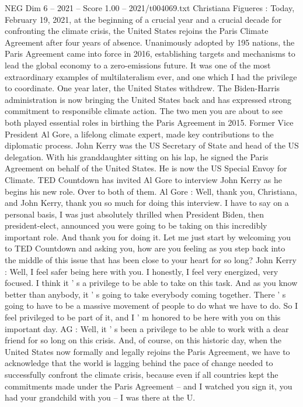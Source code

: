 \begin{textsample}{NEG Dim 6 – 2021 – Score 1.00 – 2021/t004069.txt}  \label{ex:f6_neg_002}
Christiana Figueres : Today, February 19, 2021, at the beginning of a crucial year and a crucial decade for confronting the climate crisis, the United States rejoins the Paris Climate Agreement after four years of absence.
Unanimously adopted by 195 nations, the Paris Agreement came into force in 2016, establishing targets and mechanisms to lead the global economy to a zero-emissions future.
It was one of the most extraordinary examples of multilateralism ever, and one which I had the privilege to coordinate.
One year later, the United States withdrew.
The Biden-Harris administration is now bringing the United States back and has expressed strong commitment to responsible climate action.
The two men you are about to see both played essential roles in birthing the Paris Agreement in 2015.
Former Vice President Al Gore, a lifelong climate expert, made key contributions to the diplomatic process.
John Kerry was the US Secretary of State and head of the US delegation.
With his granddaughter sitting on his lap, he signed the Paris Agreement on behalf of the United States.
He is now the US Special Envoy for Climate.
TED Countdown has invited Al Gore to interview John Kerry as he begins his new role.
Over to both of them.
Al Gore : Well, thank you, Christiana, and John Kerry, thank you so much for doing this interview.
I have to say on a personal basis, I was just absolutely thrilled when President Biden, then president-elect, announced you were going to be taking on this incredibly important role.
And thank you for doing it.
Let me just start by welcoming you to TED Countdown and asking you, how are you feeling as you step back into the middle of this issue that has been close to your heart for so long?
John Kerry : Well, I feel safer being here with you.
I honestly, I feel very energized, very focused.
I think it ' s a privilege to be able to take on this task.
And as you know better than anybody, it ' s going to take everybody coming together.
There ' s going to have to be a massive movement of people to do what we have to do.
So I feel privileged to be part of it, and I ' m honored to be here with you on this important day.
AG : Well, it ' s been a privilege to be able to work with a dear friend for so long on this crisis.
And, of course, on this historic day, when the United States now formally and legally rejoins the Paris Agreement, we have to acknowledge that the world is lagging behind the pace of change needed to successfully confront the climate crisis, because even if all countries kept the commitments made under the Paris Agreement -- and I watched you sign it, you had your grandchild with you -- I was there at the U.

\end{textsample}
